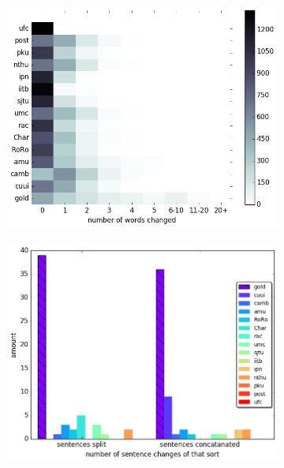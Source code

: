\documentclass[letterpaper, 11pt]{article}
\begin{document}
\begin{figure}
  \centering
  \begin{subfigure}[]{0.4\textwidth}
    \includegraphics[width = \textwidth]{words_differences_heat}
  \end{subfigure}
  \begin{subfigure}[]{0.4\textwidth}
    \includegraphics[width = \textwidth]{aligned}
  \end{subfigure}
  \begin{subfigure}[]{0.4\textwidth}

\end{subfigure}
\end{figure}
\end{document}
